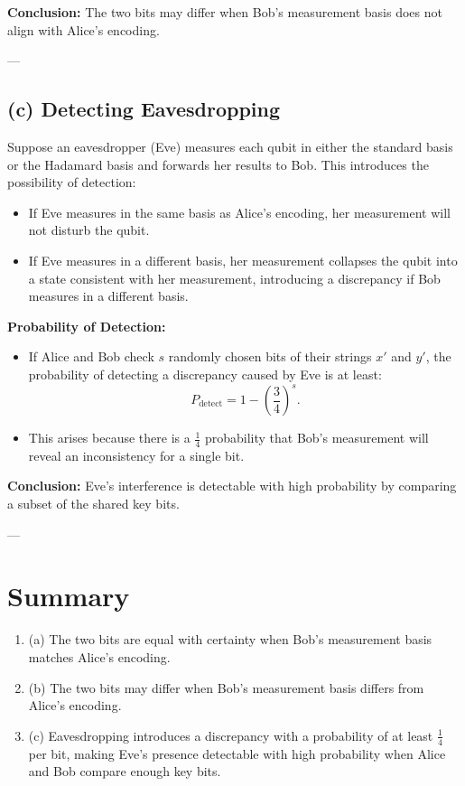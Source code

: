 \documentclass[12pt,letterpaper]{article}
\begin{document}
\textbf{Conclusion:} The two bits may differ when Bob's measurement basis does not align with Alice's encoding.

---

\subsection*{(c) Detecting Eavesdropping}

Suppose an eavesdropper (Eve) measures each qubit in either the standard basis or the Hadamard basis and forwards her results to Bob. This introduces the possibility of detection:
\begin{itemize}
    \item If Eve measures in the same basis as Alice's encoding, her measurement will not disturb the qubit.
    \item If Eve measures in a different basis, her measurement collapses the qubit into a state consistent with her measurement, introducing a discrepancy if Bob measures in a different basis.
\end{itemize}

\textbf{Probability of Detection:}
\begin{itemize}
    \item If Alice and Bob check \( s \) randomly chosen bits of their strings \( x' \) and \( y' \), the probability of detecting a discrepancy caused by Eve is at least:
    \[
    P_{\text{detect}} = 1 - \left(\frac{3}{4}\right)^s.
    \]
    \item This arises because there is a \( \frac{1}{4} \) probability that Bob's measurement will reveal an inconsistency for a single bit.
\end{itemize}

\textbf{Conclusion:} Eve's interference is detectable with high probability by comparing a subset of the shared key bits.

---

\section*{Summary}

\begin{enumerate}
    \item (a) The two bits are equal with certainty when Bob's measurement basis matches Alice's encoding.
    \item (b) The two bits may differ when Bob's measurement basis differs from Alice's encoding.
    \item (c) Eavesdropping introduces a discrepancy with a probability of at least \( \frac{1}{4} \) per bit, making Eve's presence detectable with high probability when Alice and Bob compare enough key bits.
\end{enumerate}
\end{document}
